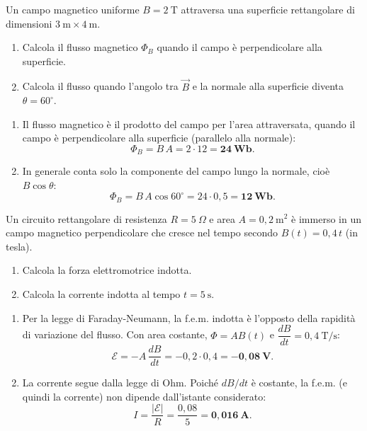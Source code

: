 \begin{question}[ID=1.1, subtitle={Flusso magnetico attraverso superficie rettangolare}, tags={induzione magnetica, flusso}, difficulty=facile]
Un campo magnetico uniforme $B = 2\ \text{T}$ attraversa una superficie rettangolare di dimensioni $3\ \text{m}\times 4\ \text{m}$.
\begin{enumerate}
    \item Calcola il flusso magnetico $\Phi_B$ quando il campo è perpendicolare alla superficie.
    \item Calcola il flusso quando l'angolo tra $\vec{B}$ e la normale alla superficie diventa $\theta = 60^\circ$.
\end{enumerate}
\begin{solution}
    \begin{enumerate}
        \item Il flusso magnetico è il prodotto del campo per l'area attraversata, quando il campo è perpendicolare alla superficie (parallelo alla normale):
        \[
        \Phi_B = B\,A = 2\cdot 12 = \mathbf{24\ \text{Wb}}.
        \]
        \item In generale conta solo la componente del campo lungo la normale, cioè $B\cos\theta$:
        \[
        \Phi_B = B\,A\cos 60^\circ = 24\cdot 0{,}5 = \mathbf{12\ \text{Wb}}.
        \]
    \end{enumerate}
\end{solution}
\end{question}

\begin{question}[ID=1.2, subtitle={f.e.m. e corrente indotta in circuito con campo variabile linearmente}, tags={induzione magnetica, legge di Faraday}, difficulty=facile]
Un circuito rettangolare di resistenza $R = 5\ \Omega$ e area $A = 0{,}2\ \text{m}^2$ è immerso in un campo magnetico perpendicolare che cresce nel tempo secondo $B(t) = 0{,}4\,t$ (in tesla).
\begin{enumerate}
    \item Calcola la forza elettromotrice indotta.
    \item Calcola la corrente indotta al tempo $t = 5\ \text{s}$.
\end{enumerate}
\begin{solution}
    \begin{enumerate}
        \item Per la legge di Faraday-Neumann, la f.e.m. indotta è l'opposto della rapidità di variazione del flusso. Con area costante, $\Phi = AB(t)$ e $\dfrac{dB}{dt} = 0{,}4\ \text{T/s}$:
        \[
        \mathcal{E} = -A\,\frac{dB}{dt} = -0{,}2\cdot 0{,}4 = \mathbf{-0{,}08\ \text{V}}.
        \]
        \item La corrente segue dalla legge di Ohm. Poiché $dB/dt$ è costante, la f.e.m. (e quindi la corrente) non dipende dall'istante considerato:
        \[
        I = \frac{|\mathcal{E}|}{R} = \frac{0{,}08}{5} = \mathbf{0{,}016\ \text{A}}.
        \]
    \end{enumerate}
\end{solution}
\end{question}

